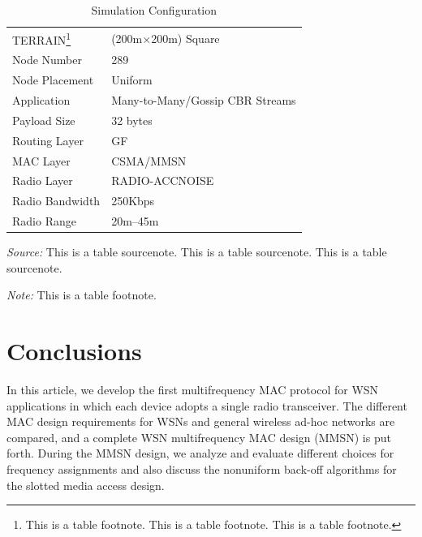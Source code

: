 \begin{table}%
\caption{Simulation Configuration}
\label{tab:one}
\begin{minipage}{\columnwidth}
\begin{center}
\begin{tabular}{ll}
  \toprule
  TERRAIN\footnote{This is a table footnote. This is a
    table footnote. This is a table footnote.}   & (200m$\times$200m) Square\\
  Node Number     & 289\\
  Node Placement  & Uniform\\
  Application     & Many-to-Many/Gossip CBR Streams\\
  Payload Size    & 32 bytes\\
  Routing Layer   & GF\\
  MAC Layer       & CSMA/MMSN\\
  Radio Layer     & RADIO-ACCNOISE\\
  Radio Bandwidth & 250Kbps\\
  Radio Range     & 20m--45m\\
  \bottomrule
\end{tabular}
\end{center}
\bigskip\centering
\footnotesize\emph{Source:} This is a table
 sourcenote. This is a table sourcenote. This is a table
 sourcenote.

 \emph{Note:} This is a table footnote.
\end{minipage}
\end{table}%


\section{Conclusions}

In this article, we develop the first multifrequency MAC protocol for
WSN applications in which each device adopts a
single radio transceiver. The different MAC design requirements for
WSNs and general wireless ad-hoc networks are
compared, and a complete WSN multifrequency MAC design (MMSN) is
put forth. During the MMSN design, we analyze and evaluate different
choices for frequency assignments and also discuss the nonuniform
back-off algorithms for the slotted media access design.


